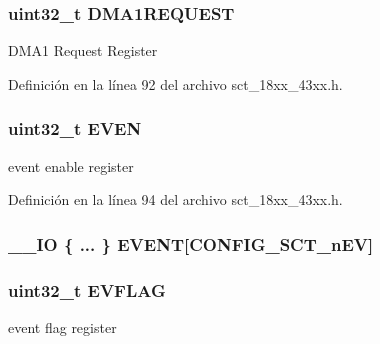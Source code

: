 \subsubsection[{\texorpdfstring{D\+M\+A1\+R\+E\+Q\+U\+E\+ST}{DMA1REQUEST}}]{ uint32\+\_\+t D\+M\+A1\+R\+E\+Q\+U\+E\+ST}\hypertarget{struct_l_p_c___s_c_t___t_a9c50c7349e1a00f65e72d953010d4cac}{}\label{struct_l_p_c___s_c_t___t_a9c50c7349e1a00f65e72d953010d4cac}
D\+M\+A1 Request Register 

Definición en la línea 92 del archivo sct\+\_\+18xx\+\_\+43xx.\+h.

\subsubsection[{\texorpdfstring{E\+V\+EN}{EVEN}}]{ uint32\+\_\+t E\+V\+EN}\hypertarget{struct_l_p_c___s_c_t___t_ae792bceba5bde97d28b81d914a3445c7}{}\label{struct_l_p_c___s_c_t___t_ae792bceba5bde97d28b81d914a3445c7}
event enable register 

Definición en la línea 94 del archivo sct\+\_\+18xx\+\_\+43xx.\+h.

\subsubsection[{\texorpdfstring{E\+V\+E\+NT}{EVENT}}]{\setlength{\rightskip}{0pt plus 5cm}\+\_\+\+\_\+\+IO \{ ... \}   E\+V\+E\+NT\mbox{[}{\bf C\+O\+N\+F\+I\+G\+\_\+\+S\+C\+T\+\_\+n\+EV}\mbox{]}}\hypertarget{struct_l_p_c___s_c_t___t_a3d4559423db3c3be859ed103acff4b67}{}\label{struct_l_p_c___s_c_t___t_a3d4559423db3c3be859ed103acff4b67}
\subsubsection[{\texorpdfstring{E\+V\+F\+L\+AG}{EVFLAG}}]{ uint32\+\_\+t E\+V\+F\+L\+AG}\hypertarget{struct_l_p_c___s_c_t___t_a00c615ad4f37d931241886f1be3352a1}{}\label{struct_l_p_c___s_c_t___t_a00c615ad4f37d931241886f1be3352a1}
event flag register 

